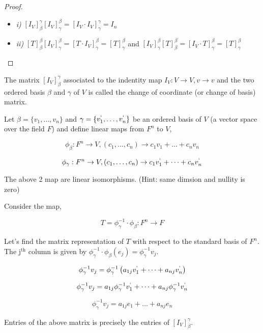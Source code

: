 \documentclass[11pt,a4paper]{colorart}
\def\l{\left}
\def\r{\right}
\def\b{\beta}
\def\g{\gamma}
\begin{document}
\begin{proof}
\
\begin{itemize}
	
	\item \textit{i) } $\l[I_V\r]^\g_\b \l[I_V\r]^\b_\g = \l[I_V\cdot I_V\r]^\g_\g = I_n $	
	
	\item \textit{ii)} $\l[T\r]^\b_\b \l[I_V\r]^\b_\g = \l[T\cdot I_V\r]^\b_\g = \l[T\r]^\b_\g $ and $\l[I_V\r]^\b_\g \l[T\r]^\b_\b = \l[I_V\cdot T\r]^\b_\g = \l[T\r]^\b_\g $	

\end{itemize}

\end{proof}

\begin{definition}
	The matrix $\l[I_V\r]^\g_\b$ associated to the indentity map $I_V:V\rightarrow V,v\rightarrow v$ and the two ordered basis $\b$ and $\g$ of $V$ is called the change of coordinate (or change of basis) matrix.
\end{definition}



Let $\b=\{v_1,\dots,v_n\}$ and $\g = \{v_1^`,\dots,v_n^`\}$ be an ordered basis of $V$ (a vector space over the field $F$) and define linear maps from $F^n$ to $V$,

\[ \phi_\b:F^n\rightarrow V, \l(c_1,\dots,c_n\r)\rightarrow c_1v_1+\dots +c_nv_n \]

\[ \phi_\g:F^n\rightarrow V, \l(c_1,\dots,c_n\r)\rightarrow c_1v_1^`+\dots +c_nv_n^` \]

The above 2 map are linear isomorphisms. (Hint: same dimsion and nullity is zero)\

Consider the map,

\[ T = \phi_\g^{-1}\cdot \phi_\b: F^n\rightarrow F\]

Let's find the matrix representation of $T$ with respect to the standard basis of $F^n$. The j$^\text{th}$ column is given by $\phi^{-1}_\g\cdot\phi_\b\l( e_j \r) = \phi^{-1}_\g v_j $.

\[ \phi^{-1}_\g v_j = \phi^{-1}_\g \l(a_{1j}v_1^`+\dots+a_{nj}v_n^`\r) \]

\[ \phi^{-1}_\g v_j =  a_{1j}\phi^{-1}_\g v_1^`+\dots+a_{nj}\phi^{-1}_\g v_n^` \]

\[ \phi^{-1}_\g v_j =  a_{1j}e_1+\dots+a_{nj}e_n \]

Entries of the above matrix is precisely the entries of $\l[I_V\r]^\g_\b$.
\end{document}
